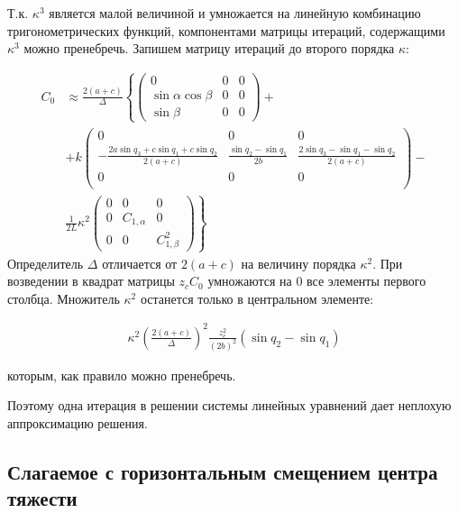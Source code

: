 Т.к. $\kappa^3$ является малой величиной и умножается на линейную комбинацию тригонометрических функций, компонентами матрицы итераций, содержащими $\kappa^3$ можно пренебречь. Запишем матрицу итераций до второго порядка $\kappa$:

\begin{equation}
\begin{aligned}
	C_0 & \approx \frac{2\left(a+c\right)}{\Delta}\left\lbrace \begin{pmatrix}
	0 & 0 & 0 \\ \sin{\alpha}\cos{\beta} & 0 & 0 \\ \sin{\beta} & 0 & 0
	\end{pmatrix} + \right.\\
	&\left. + k\begin{pmatrix}
	0 & 0 & 0 \\
	-\frac{2a\sin{q_3}+c\sin{q_1}+c\sin{q_2}}{2\left(a+c\right)} & \frac{\sin{q_2}-\sin{q_1}}{2b} & \frac{2\sin{q_3} - \sin{q_1} - \sin{q_2}}{2\left(a+c\right)}\\
	0 & 0 & 0 \\
	\end{pmatrix} - \right.\\
	& \left.\frac{1}{2L}\kappa^2\begin{pmatrix}
	0 & 0 & 0 \\
	0 & C_{1,\alpha} & 0 \\
	0 & 0 & C^2_{1,\beta}
	\end{pmatrix}\right\rbrace
\end{aligned}
\end{equation}
 Определитель $\Delta$ отличается от $2\left(a+c\right)$ на величину порядка $\kappa^2$. При возведении в квадрат матрицы $z_cC_0$ умножаются на 0 все элементы первого столбца. Множитель $\kappa^2$ останется только в центральном элементе:

\begin{equation}
\begin{aligned}
	\kappa^2\left(\frac{2\left(a+c\right)}{\Delta}\right)^2 \frac{z^2_c}{\left(2b\right)^2}\left(\sin{q_2} - \sin{q_1}\right)
\end{aligned}
\end{equation}

которым, как правило можно пренебречь.

Поэтому одна итерация в решении системы линейных уравнений дает неплохую аппроксимацию решения.

\subsection{Слагаемое с горизонтальным смещением центра тяжести}

